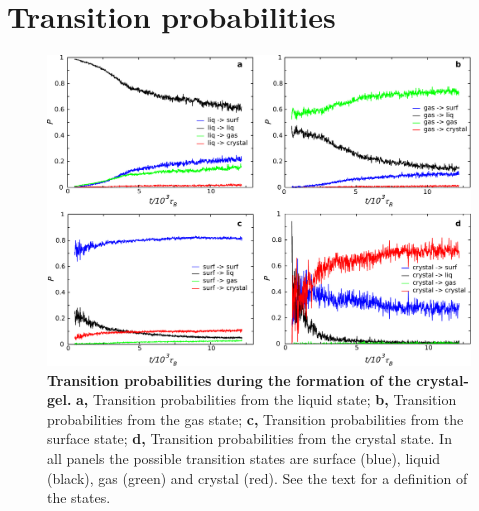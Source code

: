 \section*{Transition probabilities}
\begin{figure}[!t]
 \centering
 \includegraphics[width=14cm]{./sfig1.pdf}
 \caption{{\bf Transition probabilities during the formation of the crystal-gel.}
 {\bf a,} Transition probabilities from the liquid state;
 {\bf b,} Transition probabilities from the gas state;
 {\bf c,} Transition probabilities from the surface state;
 {\bf d,} Transition probabilities from the crystal state. In all panels the possible
 transition states are surface (blue), liquid (black), gas (green) and crystal (red).
 See the text for a definition of the states.
 }
 \label{fig:probabilities}
\end{figure}

